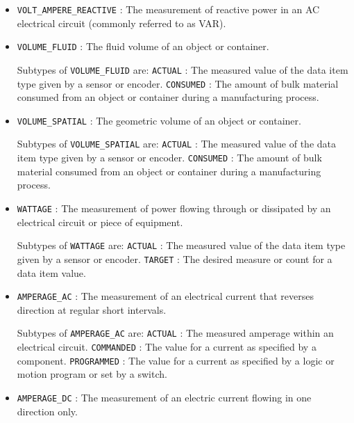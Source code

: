 \begin{itemize}
\item \texttt{VOLT_AMPERE_REACTIVE} : The measurement of reactive power in an AC electrical circuit (commonly referred to as VAR). 

\item \texttt{VOLUME_FLUID} : The fluid volume of an object or container. 

Subtypes of \texttt{VOLUME_FLUID} are: 
\newline\tab \texttt{ACTUAL} : The measured value of the data item type given by a sensor or encoder. 
\newline\tab \texttt{CONSUMED} : The amount of bulk material consumed from an object or container during a manufacturing process. 
\item \texttt{VOLUME_SPATIAL} : The geometric volume of an object or container. 

Subtypes of \texttt{VOLUME_SPATIAL} are: 
\newline\tab \texttt{ACTUAL} : The measured value of the data item type given by a sensor or encoder. 
\newline\tab \texttt{CONSUMED} : The amount of bulk material consumed from an object or container during a manufacturing process. 
\item \texttt{WATTAGE} : The measurement of power flowing through or dissipated by an electrical circuit or piece of equipment. 

Subtypes of \texttt{WATTAGE} are: 
\newline\tab \texttt{ACTUAL} : The measured value of the data item type given by a sensor or encoder. 
\newline\tab \texttt{TARGET} : The desired measure or count for a data item value. 
\item \texttt{AMPERAGE_AC} : The measurement of an electrical current that reverses direction at regular short intervals. 

Subtypes of \texttt{AMPERAGE_AC} are: 
\newline\tab \texttt{ACTUAL} : The measured amperage within an electrical circuit. 
\newline\tab \texttt{COMMANDED} : The value for a current as specified by a component.  
\newline\tab \texttt{PROGRAMMED} : The value for a current as specified by a logic or motion program or set by a switch. 
\item \texttt{AMPERAGE_DC} : The measurement of an electric current flowing in one direction only. 


\end{itemize}
